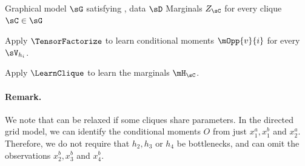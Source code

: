 \renewcommand{\algorithmicrequire}{\textbf{Input:}}
\renewcommand{\algorithmicensure}{\textbf{Output:}}
\begin{algorithm}
  \caption{\LearnMarginals}
  \label{algo:directed}
  \begin{algorithmic}
    \REQUIRE Graphical model $\sG$ satisfying , data $\sD$
    \ENSURE Marginals $Z_\sC$ for every clique $\sC \in \sG$

        \STATE Apply $\TensorFactorize$ to learn conditional moments
        $\mOpp{v}{i}$ for every $\sV_{h_i}$.

      \ENDFOR
\STATE Apply $\LearnClique$ to learn the marginals $\mH_\sC$.
\ENDFOR
  \end{algorithmic}
\end{algorithm}

\paragraph{Remark.} We note that  can be relaxed if some cliques
  share parameters.
In the directed grid model, we can identify the conditional moments $O$ from just
  $x^a_1, x^b_1$ and $x^a_2$.
  Therefore, we do not require that $h_2, h_3$ or $h_4$
  be bottlenecks, and can omit the observations $x^b_2, x^b_3$ and $x^b_4$.

